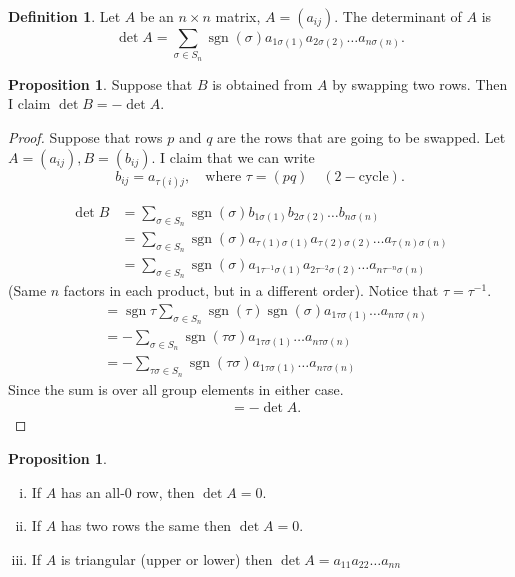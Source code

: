 \documentclass{article}
\theoremstyle{definition} \newtheorem*{definition}{Definition}
\newtheorem{proposition}[theorem]{Proposition}
\DeclareMathOperator{\sgn}{sgn} \DeclareMathOperator{\id}{id}
\begin{document}
\begin{definition} Let $A$ be an $n \times n$ matrix, $A = (a_{ij})$. The
  determinant of $A$ is \[ \det A = \sum_{\sigma \in S_n} \sgn(\sigma)
  a_{1\sigma(1)}a_{2\sigma (2)}\dots a_{n \sigma (n)}.  \] \end{definition}

\begin{proposition} \label{prp:swaprows} Suppose that $B$ is obtained from $A$
  by swapping two rows. Then I claim $\det B = -\det A$.  \end{proposition}

  \begin{proof} Suppose that rows $p$ and $q$ are the rows that are going to be
    swapped. Let $A=(a_{ij}),B=(b_{ij})$. I claim that we can write \[ b_{ij} =
    a_{\tau (i) j}, \quad\text{where }\tau = (pq) \quad (2-\text{cycle}).\]

      \begin{align*} \det B &= \sum_{\sigma \in S_n} \sgn(\sigma)
        b_{1\sigma(1)}b_{2\sigma (2)}\dots b_{n \sigma (n)}\\ &= \sum_{\sigma
        \in S_n} \sgn(\sigma) a_{\tau(1)\sigma(1)}a_{\tau(2)\sigma (2)}\dots
        a_{\tau(n) \sigma (n)}\\ &= \sum_{\sigma \in S_n} \sgn(\sigma)
        a_{1\tau^{-1}\sigma(1)}a_{2\tau^{-2}\sigma (2)}\dots a_{n\tau^{-n}
      \sigma (n)} \end{align*} (Same $n$ factors in each product, but in a
    different order). Notice that $\tau = \tau^{-1}$.  \begin{align*} &=
      \sgn{\tau} \sum_{\sigma \in
      S_n}\sgn(\tau)\sgn(\sigma)a_{1\tau\sigma(1)}\dots a_{n \tau\sigma(n)} \\
      &= - \sum_{\sigma \in S_n}\sgn(\tau\sigma)a_{1\tau\sigma(1)}\dots a_{n
      \tau\sigma(n)} \\ &= - \sum_{\tau\sigma \in
      S_n}\sgn(\tau\sigma)a_{1\tau\sigma(1)}\dots a_{n \tau\sigma(n)}
    \end{align*} Since the sum is over all group elements in either case.
    \begin{align*} &= -\det A.  \end{align*} \end{proof}

  \begin{proposition}\hfill \label{prp:rowssame} \begin{enumerate}[(i)] \item If $A$
          has an all-0 row, then $\det A=0$.  \item If $A$ has two rows the
          same then $\det A=0$.  \item If $A$ is triangular (upper or lower)
            then $\det A=a_{11}a_{22}\dots a_{nn}$ \end{enumerate}


  \end{proposition}
\end{document}
